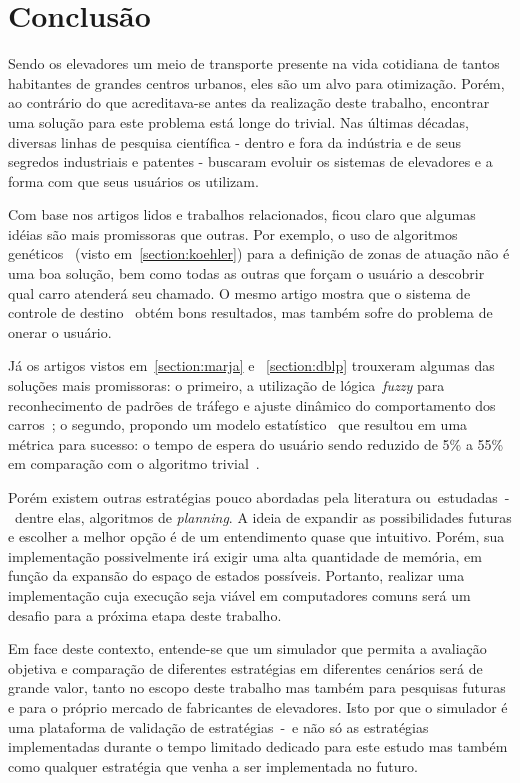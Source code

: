 \chapter{\label{chap:conclusion}Conclusão}

Sendo os elevadores um meio de transporte presente na vida cotidiana de tantos
habitantes de grandes centros urbanos, eles são um alvo para otimização. Porém,
ao contrário do que acreditava-se antes da realização deste trabalho, encontrar
uma solução para este problema está longe do trivial. Nas últimas décadas,
diversas linhas de pesquisa científica - dentro e fora da indústria e de seus
segredos industriais e patentes - buscaram evoluir os sistemas de elevadores e a
forma com que seus usuários os utilizam.

Com base nos artigos lidos e trabalhos relacionados, ficou claro que algumas
idéias são mais promissoras que outras. Por exemplo, o uso de algoritmos
genéticos~\cite{KOEHLEROTTIGER02} (visto em~\ref{section:koehler}) para a
definição de zonas de atuação não é uma boa solução, bem como todas as outras
que forçam o usuário a descobrir qual carro atenderá seu chamado. O mesmo artigo
mostra que o sistema de controle de destino~\cite{KOEHLEROTTIGER02} obtém bons
resultados, mas também sofre do problema de onerar o usuário.

Já os artigos vistos em~\ref{section:marja} e ~\ref{section:dblp} trouxeram
algumas das soluções mais promissoras: o primeiro, a utilização de
lógica~\textit{fuzzy} para reconhecimento de padrões de tráfego e ajuste
dinâmico do comportamento dos carros~\cite{marja97}; o segundo, propondo um
modelo estatístico~\cite{DBLP:journals/corr/abs-1212-2499} que resultou em uma
métrica para sucesso: o tempo de espera do usuário sendo reduzido de 5\% a 55\%
em comparação com o algoritmo trivial~\cite{DBLP:journals/corr/abs-1212-2499}.

Porém existem outras estratégias pouco abordadas pela literatura
ou~estudadas~-~dentre elas, algoritmos de \textit{planning}. A ideia de expandir
as possibilidades futuras e escolher a melhor opção é de um entendimento quase
que intuitivo. Porém, sua implementação possivelmente irá exigir uma alta
quantidade de memória, em função da expansão do espaço de estados possíveis.
Portanto, realizar uma implementação cuja execução seja viável em computadores
comuns será um desafio para a próxima etapa deste trabalho.

Em face deste contexto, entende-se que um simulador que permita a avaliação
objetiva e comparação de diferentes estratégias em diferentes cenários será de
grande valor, tanto no escopo deste trabalho mas também para pesquisas futuras e
para o próprio mercado de fabricantes de elevadores. Isto por que o simulador é
uma plataforma de validação de estratégias~-~e não só as estratégias
implementadas durante o tempo limitado dedicado para este estudo mas também como
qualquer estratégia que venha a ser implementada no futuro.

